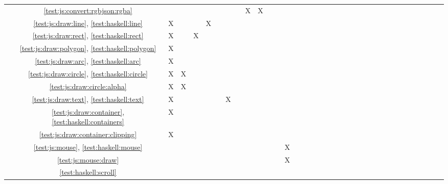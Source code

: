 \begin{tabular}{cc|c|c|c|c|c|c|c|c|c|c|c|c|c|c|c|c|c|c|c|c|c|c|c|c|c|c|c|c|c|c|c|c|c|}
\multicolumn{1}{|c|}{} & \ref{test:js:convert:rgbjson:rgba} 							&   &   &   &   &   &   &   & X & X &   &   &   &   &   &   &   &   &   &   &   &   &   &   &   &   &   &		 \\ \cline{2-29}
\multicolumn{1}{|c|}{} & \ref{test:js:draw:line}, \ref{test:haskell:line}				& X &   &   & X &   &   &   &   &   &   &   &   &   &   &   &   &   &   &   &   &   &   &   &   &   &   &		 \\ \cline{2-29}
\multicolumn{1}{|c|}{} & \ref{test:js:draw:rect}, \ref{test:haskell:rect}				& X &   & X &   &   &   &   &   &   &   &   &   &   &   &   &   &   &   &   &   &   &   &   &   &   &   &		 \\ \cline{2-29}
\multicolumn{1}{|c|}{} & \ref{test:js:draw:polygon}, \ref{test:haskell:polygon}			& X &   &   &   &   &   &   &   &   &   &   &   &   &   &   &   &   &   &   &   &   &   &   &   &   &   &		 \\ \cline{2-29}
\multicolumn{1}{|c|}{} & \ref{test:js:draw:arc}, \ref{test:haskell:arc}					& X &   &   &   &   &   &   &   &   &   &   &   &   &   &   &   &   &   &   &   &   &   &   &   &   &   &		 \\ \cline{2-29}
\multicolumn{1}{|c|}{} & \ref{test:js:draw:circle}, \ref{test:haskell:circle}			& X & X &   &   &   &   &   &   &   &   &   &   &   &   &   &   &   &   &   &   &   &   &   &   &   &   &		 \\ \cline{2-29}
\multicolumn{1}{|c|}{} & \ref{test:js:draw:circle:alpha} 								& X & X &   &   &   &   &   &   &   &   &   &   &   &   &   &   &   &   &   &   &   &   &   &   &   &   &		 \\ \cline{2-29}
\multicolumn{1}{|c|}{} & \ref{test:js:draw:text}, \ref{test:haskell:text}				& X &   &   &   &   & X &   &   &   &   &   &   &   &   &   &   &   &   &   &   &   &   &   &   &   &   &		 \\ \cline{2-29}
\multicolumn{1}{|c|}{} & \ref{test:js:draw:container}, \ref{test:haskell:containers}	& X &   &   &   &   &   &   &   &   &   &   &   &   &   &   &   &   &   &   &   &   &   &   &   &   &   &		 \\ \cline{2-29}
\multicolumn{1}{|c|}{} & \ref{test:js:draw:container:clipping} 							& X &   &   &   &   &   &   &   &   &   &   &   &   &   &   &   &   &   &   &   &   &   &   &   &   &   &		 \\ \cline{2-29}
\multicolumn{1}{|c|}{} & \ref{test:js:mouse}, \ref{test:haskell:mouse}					&   &   &   &   &   &   &   &   &   &   &   & X &   &   &   &   &   &   &   &   &   &   &   &   &   &   &		 \\ \cline{2-29}
\multicolumn{1}{|c|}{} & \ref{test:js:mouse:draw} 										&   &   &   &   &   &   &   &   &   &   &   & X &   &   &   &   &   &   &   &   &   &   &   &   &   &   &		 \\ \cline{2-29}
\multicolumn{1}{|c|}{} & \ref{test:haskell:scroll} 										&   &   &   &   &   &   &   &   &   &   &   &   &   &   &   &   &   &   &   &   &   &   &   &   &   &   &		 \\ \cline{2-29}


\end{tabular}
